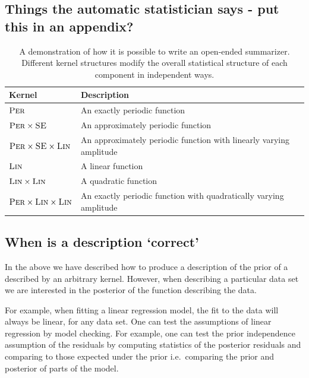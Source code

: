 \documentclass{article}
\def\ie{i.e.\ }
\begin{document}
\subsection{Things the automatic statistician says - put this in an appendix?}
\label{sec:example_translation}


\begin{table}[ht]
\begin{tabular}{l|l}
Kernel & Description \\
\midrule
${\textsc{Per}}$ & An exactly periodic function \\
${\textsc{Per}} \times {\textsc{SE}}$ & An approximately periodic function \\
${\textsc{Per}} \times {\textsc{SE}} \times {\textsc{Lin}}$ & An approximately periodic function with linearly varying amplitude \\
${\textsc{Lin}}$ & A linear function \\
${\textsc{Lin}} \times {\textsc{Lin}}$ & A quadratic function \\
${\textsc{Per}} \times {\textsc{Lin}} \times {\textsc{Lin}}$ & An exactly periodic function with quadratically varying amplitude\\
\end{tabular}
\caption{A demonstration of how it is possible to write an open-ended summarizer.  Different kernel structures modify the overall statistical structure of each component in independent ways.}
\label{table:descriptions}
\end{table}

\subsection{When is a description `correct'}

In the above we have described how to produce a description of the prior of a \gp{} described by an arbitrary kernel.
However, when describing a particular data set we are interested in the posterior of the function describing the data.

For example, when fitting a linear regression model, the fit to the data will always be linear, for any data set.
One can test the assumptions of linear regression by model checking.
For example, one can test the prior independence assumption of the residuals by computing statistics of the posterior residuals and comparing to those expected under the prior \ie comparing the prior and posterior of parts of the model.
\end{document}

